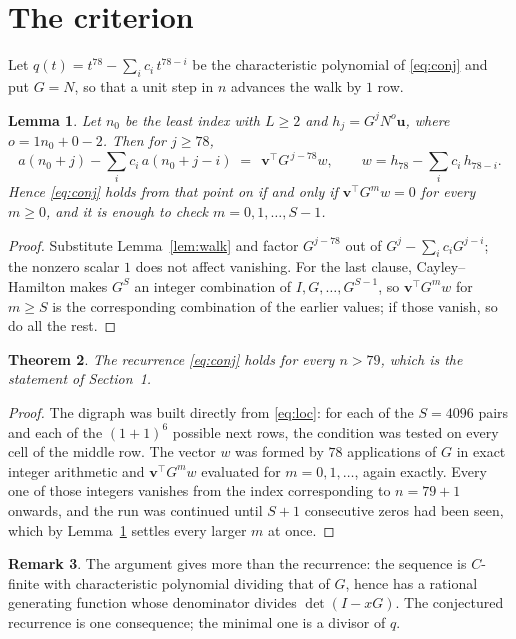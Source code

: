 \documentclass[11pt,a4paper]{article}
\theoremstyle{plain}
\newtheorem{theorem}{Theorem}
\newtheorem{lemma}[theorem]{Lemma}
\theoremstyle{definition}
\newtheorem{remark}[theorem]{Remark}
\begin{document}
\section{The criterion}

Let $q(t)=t^{78}-\sum_i c_i\,t^{78-i}$ be the characteristic polynomial of
\eqref{eq:conj} and put $G=N$, so that a unit step in $n$ advances the walk by
$1$ row.

\begin{lemma}\label{lem:crit}
Let $n_0$ be the least index with $L\ge2$ and $h_j=G^{j}N^{o}\mathbf{u}$, where
$o=1n_0+0-2$. Then for $j\ge78$,
\[
a(n_0+j)-\sum_i c_i\,a(n_0+j-i)\;=\;\,\mathbf{v}^{\!\top}G^{\,j-78}w,
\qquad w=h_{78}-\sum_i c_i\,h_{78-i} .
\]
Hence \eqref{eq:conj} holds from that point on if and only if
$\mathbf{v}^{\!\top}G^{m}w=0$ for every $m\ge0$, and it is enough to check
$m=0,1,\dots,S-1$.
\end{lemma}

\begin{proof}
Substitute Lemma~\ref{lem:walk} and factor $G^{j-78}$ out of
$G^{j}-\sum_ic_iG^{j-i}$; the nonzero scalar $1$ does not affect
vanishing. For the last clause, Cayley--Hamilton makes $G^{S}$ an integer combination of
$I,G,\dots,G^{S-1}$, so $\mathbf{v}^{\!\top}G^{m}w$ for $m\ge S$ is the corresponding
combination of the earlier values; if those vanish, so do all the rest.
\end{proof}

\begin{theorem}
The recurrence \eqref{eq:conj} holds for every $n>79$, which is the statement of
Section~1.
\end{theorem}

\begin{proof}
The digraph was built directly from \eqref{eq:loc}: for each of the $S=4096$ pairs and each
of the $(1+1)^{6}$ possible next rows, the condition was tested on every cell of
the middle row. The vector $w$ was formed by $78$ applications of $G$ in exact integer
arithmetic and $\mathbf{v}^{\!\top}G^{m}w$ evaluated for $m=0,1,\dots$, again exactly.
Every one of those integers vanishes from the index corresponding to $n=79+1$ onwards,
and the run was continued until $S+1$ consecutive zeros had been seen, which by
Lemma~\ref{lem:crit} settles every larger $m$ at once.
\end{proof}

\begin{remark}
The argument gives more than the recurrence: the sequence is $C$-finite with characteristic
polynomial dividing that of $G$, hence has a rational generating function whose denominator
divides $\det(I-xG)$. The conjectured recurrence is one consequence; the minimal one is a
divisor of $q$.
\end{remark}
\end{document}
